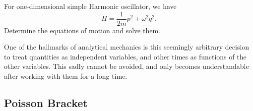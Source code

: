 \begin{exercise}
  For one-dimensional simple Harmonic oscillator, we have
  \begin{equation}
H = \frac{1}{2m}p^{2} + \omega^{2}q^{2}.
  \end{equation}
Determine the equations of motion and solve them.
\end{exercise}

\begin{remark}
One of the hallmarks of analytical mechanics is this seemingly arbitrary
decision to treat quantities as independent variables, and other times
as functions of the other variables. This sadly cannot be avoided, and
only becomes understandable after working with them for a long time.
\end{remark}

\subsection{Poisson Bracket}

